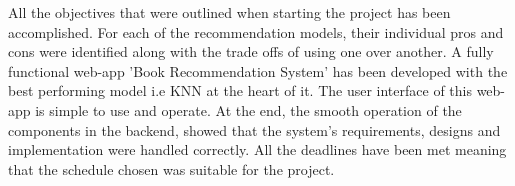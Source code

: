 All the objectives that were outlined when starting the project has been accomplished. For each of the recommendation models, their individual pros and cons were identified along with the trade offs of using one over another. A fully functional web-app 'Book Recommendation System' has been developed with the best performing model i.e KNN at the heart of it. The user interface of this web-app is simple to use and operate. At the end, the smooth operation of the components in the backend, showed that the system’s requirements, designs and implementation were handled correctly. All the deadlines have been met meaning that the schedule chosen was suitable for the project.
